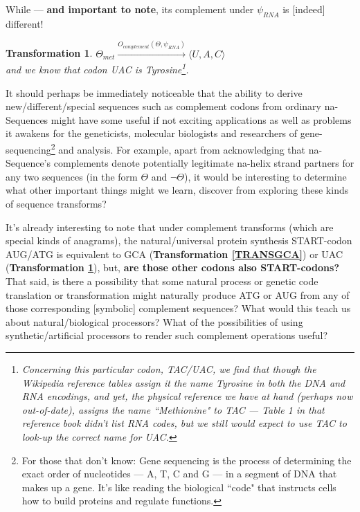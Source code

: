 \documentclass[a4paper, 18pt]{book} %
\newtheorem{trans}{Transformation}
\begin{document}
While --- \textbf{and important to note}, its complement under $\psi_{RNA}$ is [indeed] different!

\begin{trans}
\label{TRANSUAC}
$\Theta_{met} \xrightarrow{O_{complement}(\Theta,\psi_{RNA})}  \langle U, A, C \rangle$
\\
and we know that codon UAC is Tyrosine\cite{wikipedia_codon_tables}\footnote{Concerning this particular codon, TAC/UAC, we find that though the Wikipedia reference tables assign it the name Tyrosine in both the DNA and RNA encodings, and yet, the physical reference we have at hand\cite{gregory1987oxford} (perhaps now out-of-date), assigns the name ``Methionine" to TAC --- Table 1 in that reference book didn't list RNA codes, but we still would expect to use TAC to look-up the correct name for UAC.}.
\end{trans}

It should perhaps be immediately noticeable that the ability to derive new/different/special sequences such as complement codons from ordinary na-Sequences might have some useful if not exciting applications as well as problems it awakens for the geneticists, molecular biologists and researchers of gene-sequencing\footnote{For those that don't know: Gene sequencing is the process of determining the exact order of nucleotides --- A, T, C and G --- in a segment of DNA that makes up a gene. It's like reading the biological ``code" that instructs cells how to build proteins and regulate functions\cite{copilot_dna_assistant}.} and analysis. For example, apart from acknowledging that na-Sequence's complements denote potentially legitimate na-helix strand partners for any two sequences (in the form $\Theta$ and $\lnot\Theta$), it would be interesting to determine what other important things might we learn, discover from exploring these kinds of sequence transforms? 

It's already interesting to note that under complement transforms (which are special kinds of anagrams), the natural/universal protein synthesis START-codon AUG/ATG is equivalent to GCA (\textbf{Transformation \ref{TRANSGCA}}) or UAC (\textbf{Transformation \ref{TRANSUAC}}), but, \textbf{are those other codons also START-codons?} That said, is there a possibility that some natural process or genetic code translation or transformation might naturally produce ATG or AUG from any of those corresponding [symbolic] complement sequences? What would this teach us about natural/biological processors? What of the possibilities of using synthetic/artificial processors to render such complement operations useful?
\end{document}
